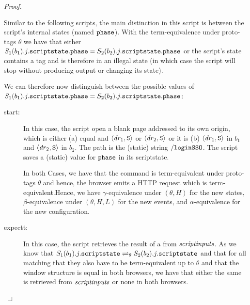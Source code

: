 \begin{proof}
\begin{description}
\begin{description}
\begin{enumerate}
            Similar to the following scripts, the main 
            distinction in this script is between the script's 
            internal states (named $\mathtt{phase}$). With the 
            term-equivalence under proto-tags $\theta$ we have 
            that either 
            $S_1(b_1).j.\mathtt{scriptstate}.\mathtt{phase} =
             S_2(b_2).j.\mathtt{scriptstate}.\mathtt{phase}$ or the 
            script's state contains a tag and is therefore in an 
            illegal state (in which case the script will stop 
            without producing output or changing its state).
  
            We can therefore now distinguish between the 
            possible values of
            $S_1(b_1).j.\mathtt{scriptstate}.\mathtt{phase} =
             S_2(b_2).j.\mathtt{scriptstate}.\mathtt{phase}$:
            \begin{description}
            \item[start:] In this case, the script open a blank
              page addressed to its own origin, which is either 
              (a) equal and $\langle\mathit{dr}_1,\mathtt{S}\rangle$ or 
              $\langle\mathit{dr}_2,\mathtt{S}\rangle$ or it is 
              (b) $\langle\mathit{dr}_1,\mathtt{S}\rangle$ in $b_1$ and
              $\langle\mathit{dr}_2,\mathtt{S}\rangle$ in $b_2$. The path is the 
              (static) string $\mathtt{/loginSSO}$. The script 
              saves a (static) value for $\mathtt{phase}$ in its 
              scriptstate.
  
              In both Cases, we have that the command is 
              term-equivalent under proto-tags $\theta$ and 
              hence, the browser emits a HTTP request which is 
              term-equivalent.Hence, we have 
              $\gamma$-equivalence under $(\theta,H)$ for the 
              new states, $\beta$-equivalence under 
              $(\theta,H,L)$ for the new events, and 
              $\alpha$-equivalence for the new configuration.
            
            \item[expectt:] In this case, the script retrieves 
              the result of a \pm from $\mathit{scriptinputs}$. As 
              we know that $S_1(b_1).j.\mathtt{scriptstate} 
              \rightleftharpoons_{\theta} 
              S_2(b_2).j.\mathtt{scriptstate}$ and that for all 
              matching \pms that they also have to be 
              term-equivalent up to $\theta$ and that the window 
              structure is equal in both browsers, we have that 
              either the same \pm is retrieved from 
              $\mathit{scriptinputs}$ or none in both browsers.
  

\end{description}
\end{enumerate}
\end{description}
\end{description}
\end{proof}
